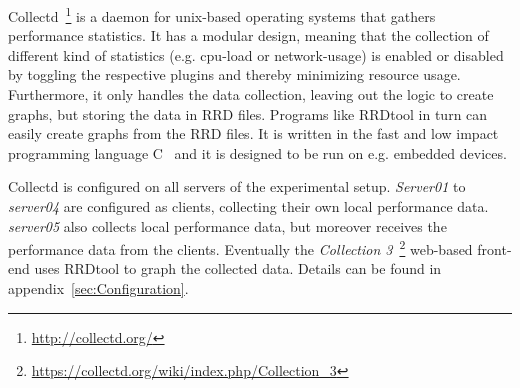 Collectd~\footnote{\url{http://collectd.org/}} is a daemon for unix-based operating systems that gathers performance statistics. It has a modular design, meaning that the collection of different kind of statistics (e.g. cpu-load or network-usage) is enabled or disabled by toggling the respective plugins and thereby minimizing resource usage. Furthermore, it only handles the data collection, leaving out the logic to create graphs, but storing the data in \ac{RRD} files. Programs like RRDtool in turn can easily create graphs from the RRD files. It is written in the fast and low impact programming language C~\cite{prechelt2000empirical} and it is designed to be run on e.g. embedded devices.

Collectd is configured on all servers of the experimental setup. \emph{Server01} to \emph{server04} are configured as clients, collecting their own local performance data. \emph{server05} also collects local performance data, but moreover receives the performance data from the clients. Eventually the \emph{Collection 3}~\footnote{\url{https://collectd.org/wiki/index.php/Collection_3}} web-based front-end uses RRDtool to graph the collected data. Details can be found in appendix~\ref{sec:Configuration}.
